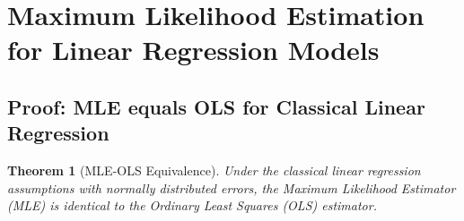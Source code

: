 \documentclass{article}
\newtheorem{theorem}{Theorem}
\begin{document}
\section{Maximum Likelihood Estimation for Linear Regression Models}

\subsection{Proof: MLE equals OLS for Classical Linear Regression}

\begin{theorem}[MLE-OLS Equivalence]
Under the classical linear regression assumptions with normally distributed errors, the Maximum Likelihood Estimator (MLE) is identical to the Ordinary Least Squares (OLS) estimator.
\end{theorem}
\end{document}
